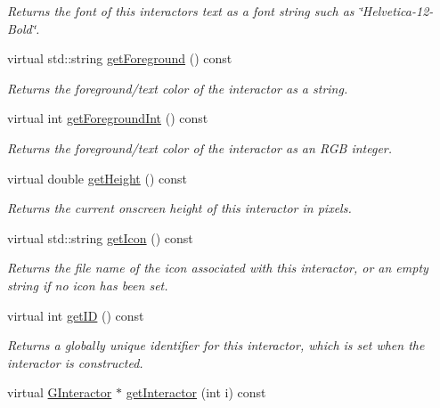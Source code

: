 \begin{DoxyCompactItemize}
\begin{DoxyCompactList}\small\item\em Returns the font of this interactor\textquotesingle{}s text as a font string such as \char`\"{}\+Helvetica-\/12-\/\+Bold\char`\"{}. \end{DoxyCompactList}\item 
virtual std\+::string \mbox{\hyperlink{classGInteractor_a4fa2d8b0192a3a5b4af4bbfe71194d03}{get\+Foreground}} () const
\begin{DoxyCompactList}\small\item\em Returns the foreground/text color of the interactor as a string. \end{DoxyCompactList}\item 
virtual int \mbox{\hyperlink{classGInteractor_ac3b12ab385a6ef9ae90fc879860ba726}{get\+Foreground\+Int}} () const
\begin{DoxyCompactList}\small\item\em Returns the foreground/text color of the interactor as an R\+GB integer. \end{DoxyCompactList}\item 
virtual double \mbox{\hyperlink{classGInteractor_a1e7e353362434072875264cf95629f99}{get\+Height}} () const
\begin{DoxyCompactList}\small\item\em Returns the current onscreen height of this interactor in pixels. \end{DoxyCompactList}\item 
virtual std\+::string \mbox{\hyperlink{classGInteractor_aaed62a73004939a64da6f0eb9eb64d73}{get\+Icon}} () const
\begin{DoxyCompactList}\small\item\em Returns the file name of the icon associated with this interactor, or an empty string if no icon has been set. \end{DoxyCompactList}\item 
virtual int \mbox{\hyperlink{classGInteractor_a9c9659a6c6ba66b4107ba59c95a24241}{get\+ID}} () const
\begin{DoxyCompactList}\small\item\em Returns a globally unique identifier for this interactor, which is set when the interactor is constructed. \end{DoxyCompactList}\item 
virtual \mbox{\hyperlink{classGInteractor}{G\+Interactor}} $\ast$ \mbox{\hyperlink{classGContainer_ac59d7bae6154f6f8791c7f1fd856b157}{get\+Interactor}} (int i) const

\end{DoxyCompactItemize}
